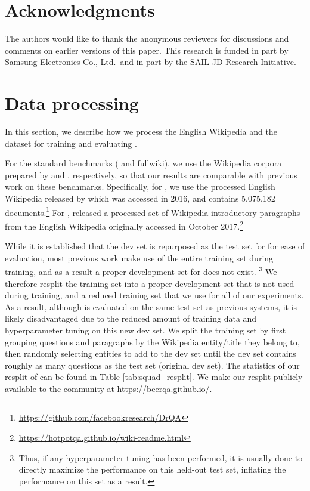 \section*{Acknowledgments}

The authors would like to thank the anonymous reviewers for discussions and comments on earlier versions of this paper. 
This research is funded in part by Samsung Electronics Co., Ltd.~and in part by the SAIL-JD Research Initiative.

\clearpage
\appendix
\section{Data processing} \label{sec:data_processing}

In this section, we describe how we process the English Wikipedia and the \squad{} dataset for training and evaluating \irrr{}.

For the standard benchmarks (\squadopen{} and \hotpotqa{} fullwiki), we use the Wikipedia corpora prepared by \citet{chen2017reading} and \citet{yang2018hotpotqa}, respectively, so that our results are comparable with previous work on these benchmarks.
Specifically, for \squadopen, we use the processed English Wikipedia released by \citet{chen2017reading} which was accessed in 2016, and contains 5,075,182 documents.\footnote{\url{https://github.com/facebookresearch/DrQA}}
For \hotpotqa{}, \citet{yang2018hotpotqa} released a processed set of Wikipedia introductory paragraphs from the English Wikipedia originally accessed in October 2017.\footnote{\url{https://hotpotqa.github.io/wiki-readme.html}}

While it is established that the \squad{} dev set is repurposed as the test set for \squadopen{} for ease of evaluation, most previous work make use of the entire training set during training, and as a result a proper development set for \squadopen{} does not exist.%
\footnote{Thus, if any hyperparameter tuning has been performed, it is usually done to directly maximize the performance on this held-out test set, inflating the performance on this set as a result.}
We therefore resplit the \squad{} training set into a proper development set that is not used during training, and a reduced training set that we use for all of our experiments.
As a result, although \irrr{} is evaluated on the same test set as previous systems, it is likely disadvantaged due to the reduced amount of training data and hyperparameter tuning on this new dev set.
We split the training set by first grouping questions and paragraphs by the Wikipedia entity/title they belong to, then randomly selecting entities to add to the dev set until the dev set contains roughly as many questions as the test set (original \squad{} dev set).
The statistics of our resplit of \squad{} can be found in Table \ref{tab:squad_resplit}.
We make our resplit publicly available to the community at \url{https://beerqa.github.io/}.

